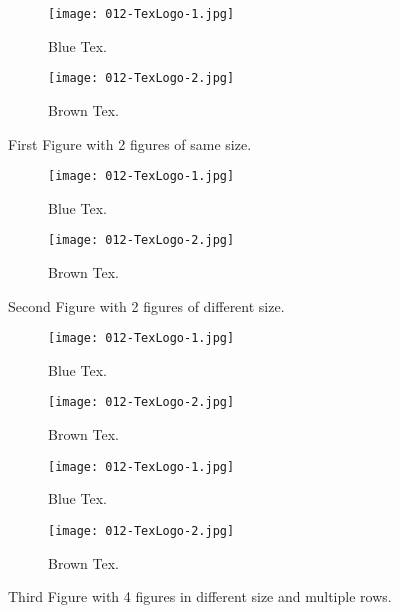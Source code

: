 \documentclass{article}
\begin{document}
	\begin{figure}[h!]
  	\centering
   	\begin{subfigure}[b]{0.4\linewidth}
    	\texttt{[image: 012-TexLogo-1.jpg]}
     	\caption{Blue Tex.}
   	\end{subfigure}
  	\begin{subfigure}[b]{0.4\linewidth}
    	\texttt{[image: 012-TexLogo-2.jpg]}
    	\caption{Brown Tex.}
  	\end{subfigure}
  	\caption{First Figure with 2 figures of same size.}
  	\label{fig:tex1}
	\end{figure}

	\begin{figure}[h!]
  	\centering
  	\begin{subfigure}[b]{0.2\linewidth}
    	\texttt{[image: 012-TexLogo-1.jpg]}
    	\caption{Blue Tex.}
  	\end{subfigure}
    \begin{subfigure}[b]{0.6\linewidth}
    	\texttt{[image: 012-TexLogo-2.jpg]}
    	\caption{Brown Tex.}
  	\end{subfigure}
  	\caption{Second Figure with 2 figures of different size.}
  	\label{fig:tex2}
	\end{figure}

	\begin{figure}[h!]
  	\centering
   	\begin{subfigure}[b]{0.2\linewidth}
    	\texttt{[image: 012-TexLogo-1.jpg]}
     	\caption{Blue Tex.}
   	\end{subfigure}
  	\begin{subfigure}[b]{0.2\linewidth}
    	\texttt{[image: 012-TexLogo-2.jpg]}
    	\caption{Brown Tex.}
  	\end{subfigure}
  	\begin{subfigure}[b]{0.2\linewidth}
    	\texttt{[image: 012-TexLogo-1.jpg]}
    	\caption{Blue Tex.}
  	\end{subfigure}
    \begin{subfigure}[b]{0.5\linewidth}
    	\texttt{[image: 012-TexLogo-2.jpg]}
    	\caption{Brown Tex.}
  	\end{subfigure}
  	\caption{Third Figure with 4 figures in different size and multiple rows.}
  	\label{fig:tex3}
	\end{figure}
\end{document}
